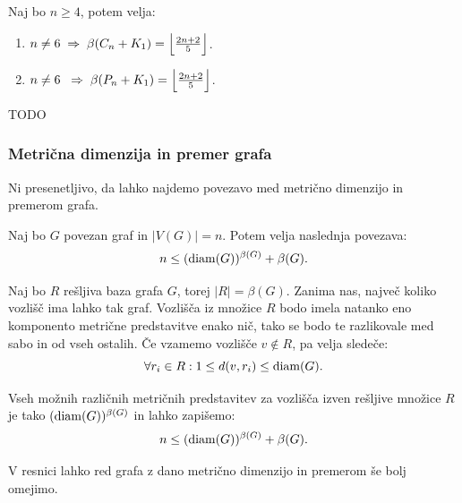 \documentclass[mat1, tisk]{fmfdelo}
\newcommand{\1}{(1, 1, \ldots, 1)}
\newcommand{\2}{(2, 2, \ldots, 2)}
\begin{document}
\begin{trditev} \label{trd:mdim_spojev}
    Naj bo $n\geq 4$, potem velja:
    \begin{enumerate}
        \item $n \neq 6 \; \Rightarrow \; \beta(C_n + K_1) = 
        \Bigl \lfloor \frac{2n + 2}{5}\Bigr \rfloor$.
        \item $n \neq 6 \; \; \Rightarrow \; \beta(P_n + K_1) = 
        \Bigl \lfloor \frac{2n + 2}{5}\Bigr \rfloor$.
    \end{enumerate}
\end{trditev}

\begin{dokaz}
    TODO
\end{dokaz}




\subsubsection{Metrična dimenzija in premer grafa} \label{ss:mdim_premer}

Ni presenetljivo, da lahko najdemo povezavo med metrično dimenzijo in premerom grafa.

\begin{trditev}\label{trd:groba_meja_mdim_premer}
    Naj bo $G$ povezan graf in $|V(G)| = n$. Potem velja naslednja povezava:
    $$n \leq ({\rm diam}(G))^{\beta (G)} + \beta (G). $$
\end{trditev}

\begin{dokaz}
    Naj bo $R$ rešljiva baza grafa $G$, torej $|R| = \beta(G).$ Zanima nas, največ koliko 
    vozlišč ima lahko tak graf. Vozlišča iz množice $R$ bodo imela natanko eno 
    komponento metrične predstavitve enako nič, tako se bodo te razlikovale med sabo in od
    vseh ostalih. Če vzamemo vozlišče $v \notin R$, pa velja sledeče:
    $$\forall r_i \in R: 1 \leq d(v, r_i) \leq {\rm diam}(G).$$
    
    Vseh možnih različnih metričnih predstavitev za vozlišča izven rešljive množice $R$ 
    je tako $({\rm diam}(G))^{\beta (G)}$
    in lahko zapišemo:
    $$n \leq ({\rm diam}(G))^{\beta (G)} + \beta (G).$$
\end{dokaz}

V resnici lahko red grafa z dano metrično dimenzijo in premerom še bolj omejimo.
\end{document}
